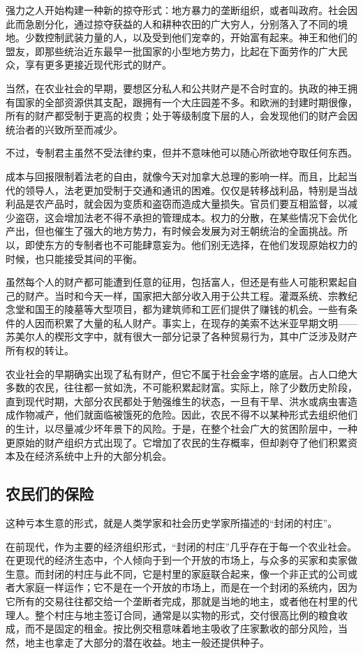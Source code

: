 强力之人开始构建一种新的掠夺形式：地方暴力的垄断组织，或者叫政府。社会因此而急剧分化，通过掠夺获益的人和耕种农田的广大穷人，分别落入了不同的境地。少数控制武装力量的人，以及受到他们宠幸的，开始富有起来。神王和他们的盟友，即那些统治近东最早一批国家的小型地方势力，比起在下面劳作的广大民众，享有更多更接近现代形式的财产。

当然，在农业社会的早期，要想区分私人和公共财产是不合时宜的。执政的神王拥有国家的全部资源供其支配，跟拥有一个大庄园差不多。和欧洲的封建时期很像，所有的财产都受制于更高的权贵；处于等级制度下层的人，会发现他们的财产会因统治者的兴致所至而减少。

不过，专制君主虽然不受法律约束，但并不意味他可以随心所欲地夺取任何东西。

成本与回报限制着法老的自由，就像今天对加拿大总理的影响一样。而且，比起当代的领导人，法老更加受制于交通和通讯的困难。仅仅是转移战利品，特别是当战利品是农产品时，就会因为变质和盗窃而造成大量损失。官员们要互相监督，以减少盗窃，这会增加法老不得不承担的管理成本。权力的分散，在某些情况下会优化产出，但也催生了强大的地方势力，有时候会发展为对王朝统治的全面挑战。所以，即使东方的专制者也不可能肆意妄为。他们别无选择，在他们发现原始权力的时候，也只能接受其间的平衡。

虽然每个人的财产都可能遭到任意的征用，包括富人，但还是有些人可能积累起自己的财产。当时和今天一样，国家把大部分收入用于公共工程。灌溉系统、宗教纪念堂和国王的陵墓等大型项目，都为建筑师和工匠们提供了赚钱的机会。一些有条件的人因而积累了大量的私人财产。事实上，在现存的美索不达米亚早期文明——苏美尔人的楔形文字中，就有很大一部分记录了各种贸易行为，其中广泛涉及财产所有权的转让。

农业社会的早期确实出现了私有财产，但它不属于社会金字塔的底层。占人口绝大多数的农民，往往都一贫如洗，不可能积累起财富。实际上，除了少数历史阶段，直到现代时期，大部分农民都处于勉强维生的状态，一旦有干旱、洪水或病虫害造成作物减产，他们就面临被饿死的危险。因此，农民不得不以某种形式去组织他们的生计，以尽量减少坏年景下的风险。于是，在整个社会广大的贫困阶层中，一种更原始的财产组织方式出现了。它增加了农民的生存概率，但却剥夺了他们积累资本及在经济系统中上升的大部分机会。

\subsection{农民们的保险}
这种亏本生意的形式，就是人类学家和社会历史学家所描述的“封闭的村庄”。

在前现代，作为主要的经济组织形式，“封闭的村庄”几乎存在于每一个农业社会。在更现代的经济生态中，个人倾向于到一个开放的市场上，与众多的买家和卖家做生意。而封闭的村庄与此不同，它是村里的家庭联合起来，像一个非正式的公司或者大家庭一样运作；它不是在一个开放的市场上，而是在一个封闭的系统内，因为它所有的交易往往都交给一个垄断者完成，那就是当地的地主，或者他在村里的代理人。整个村庄与地主签订合同，通常是以实物的形式，交付很高比例的粮食收成，而不是固定的租金。按比例交租意味着地主吸收了庄家歉收的部分风险，当然，地主也拿走了大部分的潜在收益。地主一般还提供种子。

